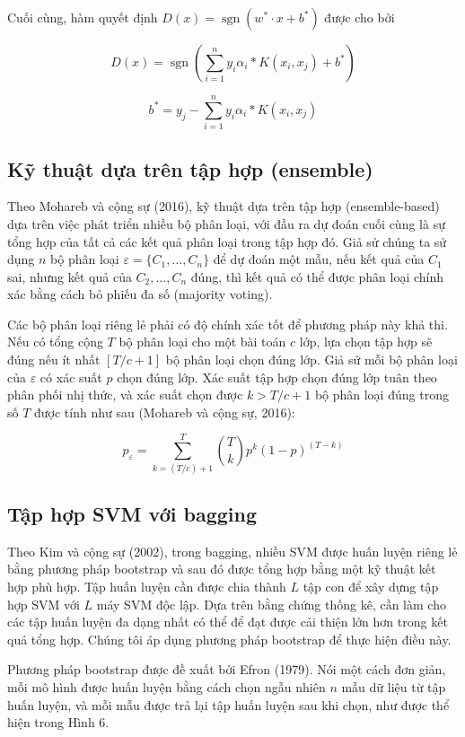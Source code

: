 Cuối cùng, hàm quyết định $D(x) = \operatorname{sgn}(w^* \cdot x + b^*)$ được cho bởi

$$
D(x) = \operatorname{sgn}\left(\sum_{i=1}^{n} y_i \alpha_i * K(x_i, x_j) + b^*\right)
$$

$$
b^* = y_j - \sum_{i=1}^{n} y_i \alpha_i * K(x_i, x_j)
$$

\subsection*{Kỹ thuật dựa trên tập hợp (ensemble)}

Theo Mohareb và cộng sự (2016), kỹ thuật dựa trên tập hợp (ensemble-based) dựa trên việc phát triển nhiều bộ phân loại, với đầu ra dự đoán cuối cùng là sự tổng hợp của tất cả các kết quả phân loại trong tập hợp đó. Giả sử chúng ta sử dụng $n$ bộ phân loại $\varepsilon = \{C_1, \dots, C_n\}$ để dự đoán một mẫu, nếu kết quả của $C_1$ sai, nhưng kết quả của $C_2, \dots, C_n$ đúng, thì kết quả có thể được phân loại chính xác bằng cách bỏ phiếu đa số (majority voting).

Các bộ phân loại riêng lẻ phải có độ chính xác tốt để phương pháp này khả thi. Nếu có tổng cộng $T$ bộ phân loại cho một bài toán $c$ lớp, lựa chọn tập hợp sẽ đúng nếu ít nhất $[T/c+1]$ bộ phân loại chọn đúng lớp. Giả sử mỗi bộ phân loại của $\varepsilon$ có xác suất $p$ chọn đúng lớp. Xác suất tập hợp chọn đúng lớp tuân theo phân phối nhị thức, và xác suất chọn được $k > T/c+1$ bộ phân loại đúng trong số $T$ được tính như sau (Mohareb và cộng sự, 2016):

$$
p_\varepsilon = \sum_{k=(T/c)+1}^{T} \binom{T}{k} p^k (1-p)^{(T-k)}
$$

\subsection*{Tập hợp SVM với bagging}

Theo Kim và cộng sự (2002), trong bagging, nhiều SVM được huấn luyện riêng lẻ bằng phương pháp bootstrap và sau đó được tổng hợp bằng một kỹ thuật kết hợp phù hợp. Tập huấn luyện cần được chia thành $L$ tập con để xây dựng tập hợp SVM với $L$ máy SVM độc lập. Dựa trên bằng chứng thống kê, cần làm cho các tập huấn luyện đa dạng nhất có thể để đạt được cải thiện lớn hơn trong kết quả tổng hợp. Chúng tôi áp dụng phương pháp bootstrap để thực hiện điều này.

Phương pháp bootstrap được đề xuất bởi Efron (1979). Nói một cách đơn giản, mỗi mô hình được huấn luyện bằng cách chọn ngẫu nhiên $n$ mẫu dữ liệu từ tập huấn luyện, và mỗi mẫu được trả lại tập huấn luyện sau khi chọn, như được thể hiện trong Hình 6.

